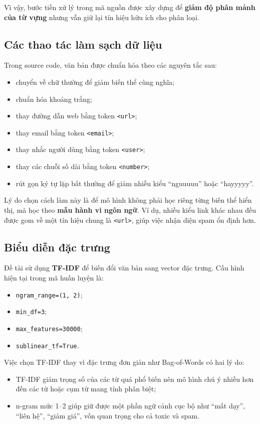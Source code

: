 \documentclass[12pt,a4paper]{article}
\begin{document}
Vì vậy, bước tiền xử lý trong mã nguồn được xây dựng để \textbf{giảm độ phân mảnh của từ vựng} nhưng vẫn giữ lại tín hiệu hữu ích cho phân loại.

\subsection{Các thao tác làm sạch dữ liệu}
Trong source code, văn bản được chuẩn hóa theo các nguyên tắc sau:
\begin{itemize}[leftmargin=1.2cm]
    \item chuyển về chữ thường để giảm biến thể cùng nghĩa;
    \item chuẩn hóa khoảng trắng;
    \item thay đường dẫn web bằng token \texttt{<url>};
    \item thay email bằng token \texttt{<email>};
    \item thay nhắc người dùng bằng token \texttt{<user>};
    \item thay các chuỗi số dài bằng token \texttt{<number>};
    \item rút gọn ký tự lặp bất thường để giảm nhiễu kiểu ``nguuuuu'' hoặc ``hayyyyy''.
\end{itemize}

Lý do chọn cách làm này là để mô hình không phải học riêng từng biến thể hiển thị, mà học theo \textbf{mẫu hành vi ngôn ngữ}. Ví dụ, nhiều kiểu link khác nhau đều được gom về một tín hiệu chung là \texttt{<url>}, giúp việc nhận diện spam ổn định hơn.

\subsection{Biểu diễn đặc trưng}
Đề tài sử dụng \textbf{TF-IDF} để biến đổi văn bản sang vector đặc trưng. Cấu hình hiện tại trong mã huấn luyện là:
\begin{itemize}[leftmargin=1.2cm]
    \item \texttt{ngram\_range=(1, 2)};
    \item \texttt{min\_df=3};
    \item \texttt{max\_features=30000};
    \item \texttt{sublinear\_tf=True}.
\end{itemize}

Việc chọn TF-IDF thay vì đặc trưng đơn giản như Bag-of-Words có hai lý do:
\begin{itemize}[leftmargin=1.2cm]
    \item TF-IDF giảm trọng số của các từ quá phổ biến nên mô hình chú ý nhiều hơn đến các từ hoặc cụm từ mang tính phân biệt;
    \item n-gram mức 1--2 giúp giữ được một phần ngữ cảnh cục bộ như ``mất dạy'', ``liên hệ'', ``giảm giá'', vốn quan trọng cho cả toxic và spam.
\end{itemize}
\end{document}
